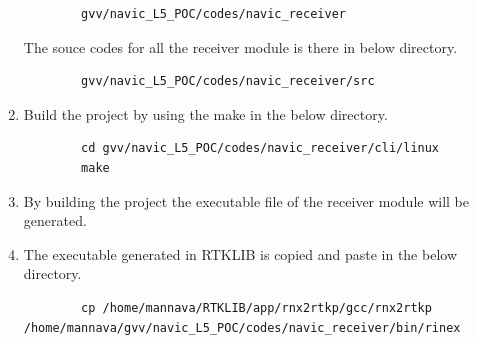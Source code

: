 \begin{enumerate}
    \begin{lstlisting}
        gvv/navic_L5_POC/codes/navic_receiver
    \end{lstlisting}
    The souce codes for all the receiver module is there in below directory.
    \begin{lstlisting}
        gvv/navic_L5_POC/codes/navic_receiver/src
    \end{lstlisting}
    \item Build the project by using the make in the below directory.
    \begin{lstlisting}
        cd gvv/navic_L5_POC/codes/navic_receiver/cli/linux
        make
    \end{lstlisting}
    \item By building the project the executable file of the receiver module will be generated.
    \item The executable generated in RTKLIB is copied and paste in the below directory.
    \begin{lstlisting}
        cp /home/mannava/RTKLIB/app/rnx2rtkp/gcc/rnx2rtkp   /home/mannava/gvv/navic_L5_POC/codes/navic_receiver/bin/rinex
    \end{lstlisting}
\end{enumerate}


